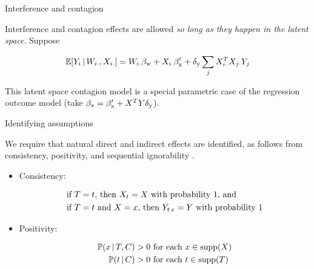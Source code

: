 \documentclass{beamer}
\theoremstyle{remark}
\begin{document}
\begin{frame}{Interference and contagion}

    Interference and contagion effects are allowed \emph{so long as they happen in the latent space}. Suppose

    \begin{align*}
        \E[\W_{i \cdot}, \X_{i \cdot}]{Y_i}
        = \W_{i \cdot} \betaw + \X_{i \cdot} \beta'_\text{x} + \delta_\text{y} \sum_{j} \X_{i \cdot}^T \X_{j \cdot} Y_j
    \end{align*}

    This latent space contagion model is a special parametric case of the regression outcome model (take $\beta_\text{x} = \beta'_\text{x} + X^T Y \delta_\text{y}$).

\end{frame}






\begin{frame}{Identifying assumptions}

    We require that natural direct and indirect effects are identified, as follows from consistency, positivity, and sequential ignorability \citep{imai_identification_2010}.

    \begin{itemize}

        \item Consistency:

              \begin{equation*}
                  \begin{aligned}
                       & \text{if $T = t$, then $X_t = X$ with probability 1, and}               \\
                       & \text{if $T = t$ and $X = x$, then $Y_{t \, x} = Y$ with probability 1}
                  \end{aligned}
              \end{equation*}

        \item Positivity:

              \begin{equation*}
                  \begin{aligned}
                      \P[T, \C]{x} & > 0 \text{ for each }  x \in \supp(\X) \\
                      \P[\C]{t}    & > 0 \text{ for each }  t \in \supp(T)
                  \end{aligned}
              \end{equation*}

    \end{itemize}

\end{frame}
\end{document}
